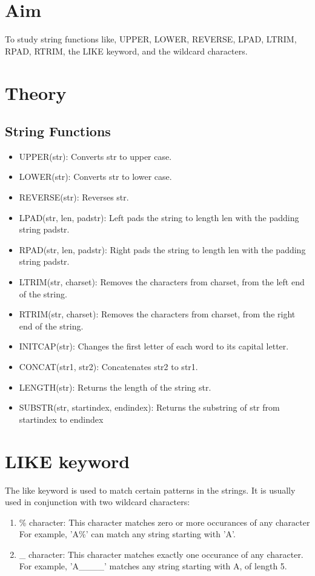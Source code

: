 \section{Aim}
 To study string functions like, UPPER, LOWER, REVERSE, LPAD, LTRIM, RPAD, RTRIM, the LIKE keyword, and the wildcard characters.

\section{{Theory}}

\subsection{String Functions}
\begin{itemize}
	\item UPPER(str): Converts str to upper case.
	\item LOWER(str): Converts str to lower case.
	\item REVERSE(str): Reverses str.
	\item LPAD(str, len, padstr): Left pads the string to length len with the padding string padstr.
	\item RPAD(str, len, padstr): Right pads the string to length len with the padding string padstr.
	\item LTRIM(str, charset): Removes the characters from charset, from the left end of the string.
	\item RTRIM(str, charset): Removes the characters from charset, from the right end of the string.
	\item INITCAP(str): Changes the first letter of each word to its capital letter.
	\item CONCAT(str1, str2): Concatenates str2 to str1.
	\item LENGTH(str): Returns the length of the string str.
	\item SUBSTR(str, startindex, endindex): Returns the substring of str from startindex to endindex
\end{itemize}

\section{LIKE keyword}

The like keyword is used to match certain patterns in the strings. It is usually used in conjunction with two wildcard characters:
\begin{enumerate}
	\item \% character: This character matches zero or more occurances of any character\newline
	For example, 'A\%' can match any string starting with 'A'.
	\item \_ character: This character matches exactly one occurance of any character.\newline
	For example, 'A\_\_\_\_' matches any string starting with A, of length 5.
\end{enumerate}

